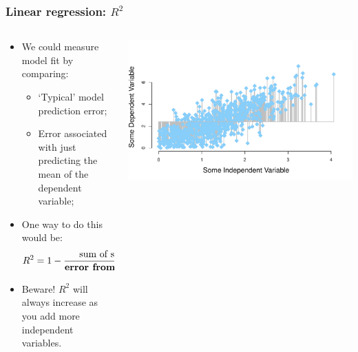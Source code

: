 \documentclass[aspectratio=169]{beamer}
\theoremstyle{principle}
\begin{document}
\begin{frame}
\frametitle{Linear regression: $R^2$}

\begin{columns}
\begin{column}{0.5\textwidth}

\begin{itemize}
\item We could measure model fit by comparing:
\begin{itemize}
\item `Typical' model prediction error;
\item Error associated with just predicting the mean of the dependent variable;
 \end{itemize}
\bigskip

\item One way to do this would be:
\begin{align*}
R^2 = 1 - \frac{\mbox{sum of squared residuals}}{\mbox{\textbf{error from predicting mean}}}
\end{align*}

\item[] \color{white}Beware!  $R^2$ will always increase as you add more independent variables.
\end{itemize}

\end{column}
\begin{column}{0.5\textwidth}

\includegraphics[scale=0.35]{point_cloud_mean_residual.pdf}

\end{column}
\end{columns}

\end{frame}
\end{document}
